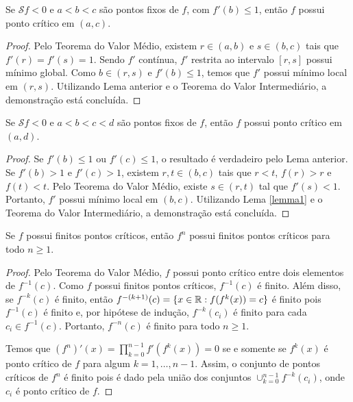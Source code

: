 \begin{lemma}
\label{lemma2}
Se $\mathcal{S} f < 0$ e $a<b<c$ são pontos fixos de $f$, com $f'(b) \leq 1$, então $f$ possui ponto crítico em $(a, c)$.
\end{lemma}

\begin{proof}
Pelo Teorema do Valor Médio, existem $r \in (a,b)$ e $s \in (b,c)$  tais que $f'(r) = f'(s) = 1$. Sendo $f'$ contínua, $f'$ restrita ao intervalo $[r,s]$ possui mínimo global. Como $b \in (r,s)$ e $f'(b) \leq 1$, temos que $f'$ possui mínimo local em $(r,s)$. Utilizando Lema anterior e o Teorema do Valor Intermediário, a demonstração está concluída.
\end{proof}

\begin{lemma}
\label{lemma3}
Se $\mathcal{S} f < 0$ e $a<b<c<d$ são pontos fixos de $f$, então $f$ possui ponto crítico em $(a,d)$.
\end{lemma}

\begin{proof}
Se $f'(b) \leq 1$ ou $f'(c) \leq 1$, o resultado é verdadeiro pelo Lema anterior. Se $f'(b) > 1$ e $f'(c) > 1$, existem $r, t \in (b,c)$ tais que $r<t$, $f(r) > r$ e $f(t) < t$. Pelo Teorema do Valor Médio, existe $s \in (r,t)$ tal que $f'(s) < 1$. Portanto, $f'$ possui mínimo local em $(b,c)$. Utilizando Lema \ref{lemma1} e o Teorema do Valor Intermediário, a demonstração está concluída.
\end{proof}

\begin{lemma}
Se $f$ possui finitos pontos críticos, então $f^n$ possui finitos pontos críticos para todo $n \geq 1$.
\end{lemma}
\begin{proof}

Pelo Teorema do Valor Médio, $f$ possui ponto crítico entre dois elementos de $f^{-1}(c)$. Como $f$ possui finitos pontos críticos, $f^{-1}(c)$ é finito. Além disso, se $f^{-k}(c)$ é finito, então $f^{-(k+1)}(c) = \{ x \in \mathbb{R} : f(f^k(x)) = c \}$ é finito pois $f^{-1}(c)$ é finito e, por hipótese de indução, $f^{-k}(c_ i)$ é finito para cada $c_i \in f^{-1}(c)$. Portanto, $f^{-n}(c)$ é finito para todo $n \geq 1$.

Temos que $(f^n)'(x) = \prod_{k=0}^{n-1} f'(f^k(x)) = 0$ se e somente se $f^k(x)$ é ponto crítico de $f$ para algum $k = 1, \dots, n-1$. Assim, o conjunto de pontos críticos de $f^n$ é finito pois é dado pela união dos conjuntos $\cup_{k=0}^{n-1} f^{-k}(c_i)$, onde $c_i$ é ponto crítico de $f$.
\end{proof}

